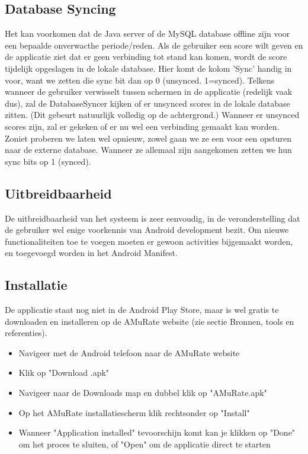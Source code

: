 \documentclass[11pt,a4paper]{article}
\begin{document}
	\subsection{Database Syncing}
	Het kan voorkomen dat de Java server of de MySQL database offline zijn voor een bepaalde onverwacthe periode/reden. Als de gebruiker een score wilt geven en de applicatie ziet dat er geen verbinding tot stand kan komen, wordt de score tijdelijk opgeslagen in de lokale database. Hier komt de kolom 'Sync' handig in voor, want we zetten die sync bit dan op 0 (unsynced. 1=synced). Telkens wanneer de gebruiker verwisselt tussen schermen in de applicatie (redelijk vaak dus), zal de DatabaseSyncer kijken of er unsynced scores in de lokale database zitten. (Dit gebeurt natuurlijk volledig op de achtergrond.) Wanneer er unsynced scores zijn, zal er gekeken of er nu wel een verbinding gemaakt kan worden. Zoniet proberen we laten wel opnieuw, zowel  gaan we ze een voor een opsturen naar de externe database. Wanneer ze allemaal zijn aangekomen zetten we hun sync bits op 1 (synced).
		
	
	\subsection{Uitbreidbaarheid}
	De uitbreidbaarheid van het systeem is zeer eenvoudig, in de veronderstelling dat de gebruiker wel enige voorkennis van Android development bezit. Om nieuwe functionaliteiten toe te voegen moeten er gewoon activities bijgemaakt worden, en toegevoegd worden in het Android Manifest.
	
	\subsection{Installatie}
	De applicatie staat nog niet in de Android Play Store, maar is wel gratis te downloaden en installeren op de AMuRate website (zie sectie Bronnen, tools en referenties). 
	\begin{itemize}
		\item Navigeer met de Android telefoon naar de AMuRate website 
		\item Klik op "Download .apk"
		\item Navigeer naar de Downloads map en dubbel klik op "AMuRate.apk"
		\item Op het AMuRate installatiescherm klik rechtsonder op "Install"
		\item Wanneer "Application installed" tevoorschijn komt kan je klikken op "Done" om het proces te sluiten, of "Open" om de applicatie direct te starten
	\end{itemize}
	
\end{document}
